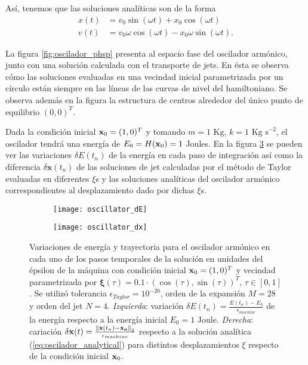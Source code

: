 Así, tenemos que las soluciones analíticas son de la forma 
\begin{align}
 x(t) &= v_{0}\sin{(\omega t)} + x_{0}\cos{(\omega t)} \nonumber \\ 
 v(t) &= v_{0}\omega\cos{(\omega t)} - x_{0}\omega\sin{(\omega t)}. 
 \label{eq:oscilador_analytical}
\end{align}

La figura \ref{fig:oscilador_phsp} presenta al espacio fase del oscilador armónico, junto con una solución calculada con el transporte de jets. En ésta se observa cómo las soluciones evaluadas en una vecindad inicial parametrizada por un círculo están siempre en las líneas de las curvas de nivel del hamiltoniano. Se observa además en la figura la estructura de centros alrededor del único punto de equilibrio $(0,0)^T$.

Dada la condición inicial $\mathbf{x}_0 = (1,0)^T$ y tomando $m = 1 \textrm{ Kg}$, $k = 1 \textrm{ Kg s}^{-2}$, el oscilador tendrá una energía de $E_0 = H(\mathbf{x}_0) = 1$ Joules. En la figura \ref{fig:oscillator_deltas} se pueden ver las variaciones $\delta E(t_n)$ de la energía en cada paso de integración así como la diferencia $\delta \mathbf{x}(t_n)$ de las soluciones de jet calculadas por el método de Taylor evaluadas en diferentes $\xi$s y las soluciones analíticas del oscilador armónico correspondientes al desplazamiento dado por dichas $\xi$s.

 \begin{figure}[h!]
\centering
\begin{subfigure}{0.49\textwidth}
	\centering
	\texttt{[image: oscillator\_dE]}
	\label{fig:oscillator_dE}
\end{subfigure}
%
\begin{subfigure}{0.49\textwidth}
	\centering
	\texttt{[image: oscillator\_dx]}
	\caption{}
	\label{fig:oscillator_dx}
\end{subfigure}
\caption{Variaciones de energía y trayectoria para el oscilador armónico en cada uno de los pasos temporales de la solución en unidades del épsilon de la máquina con condición inicial $\mathbf{x}_0 = (1,0)^T$ y vecindad parametrizada por  $\mathbf{\xi}(\tau) = 0.1\cdot \left( \cos(\tau), \sin(\tau) \right)^T$, $\tau \in [0,1]$. Se utilizó tolerancia $\epsilon_{Taylor} = 10^{-20}$, orden de la expansión $M = 28$ y orden del jet $N=4$. \textit{Izquierda}: variación $\delta E(t_n) = \frac{E(t_n)-E_0}{\epsilon_{machine}}$ de la energía respecto a la energía inicial $E_0 = 1$ Joule. \textit{Derecha}: cariación $\delta \mathbf{x}(t) =  \frac{\left\lVert\mathbf{x}(t_n) - \mathbf{x_n}\right\rVert_2}{\epsilon_{machine}}$ respecto a la solución analítica (\ref{eq:oscilador_analytical}) para distintos desplazamientos $\xi$ respecto de la condición inicial $\mathbf{x}_0$.}
\label{fig:oscillator_deltas}
\end{figure}


